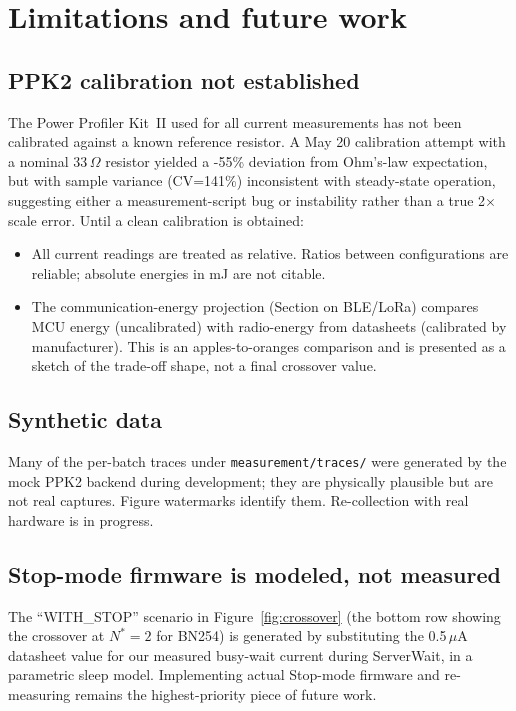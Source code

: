 \documentclass[11pt,a4paper]{article}
\begin{document}
\section{Limitations and future work}
\label{sec:limitations}

\subsection{PPK2 calibration not established}

The Power Profiler Kit~II used for all current measurements has
not been calibrated against a known reference resistor. A May 20
calibration attempt with a nominal 33\,$\Omega$ resistor yielded
a -55\% deviation from Ohm's-law expectation, but with sample
variance (CV=141\%) inconsistent with steady-state operation,
suggesting either a measurement-script bug or instability rather
than a true 2$\times$ scale error. Until a clean calibration is
obtained:

\begin{itemize}
  \item All current readings are treated as relative. Ratios
        between configurations are reliable; absolute energies
        in mJ are not citable.
  \item The communication-energy projection (Section on BLE/LoRa)
        compares MCU energy (uncalibrated) with radio-energy
        from datasheets (calibrated by manufacturer). This is
        an apples-to-oranges comparison and is presented as
        a sketch of the trade-off shape, not a final crossover
        value.
\end{itemize}

\subsection{Synthetic data}

Many of the per-batch traces under \texttt{measurement/traces/}
were generated by the mock PPK2 backend during development; they
are physically plausible but are not real captures. Figure
watermarks identify them. Re-collection with real hardware is
in progress.

\subsection{Stop-mode firmware is modeled, not measured}

The ``WITH\_STOP'' scenario in Figure~\ref{fig:crossover} (the
bottom row showing the crossover at $N^*\!=\!2$ for BN254) is
generated by substituting the 0.5\,$\mu$A datasheet value for our
measured busy-wait current during ServerWait, in a parametric
sleep model. Implementing actual Stop-mode firmware and re-measuring
remains the highest-priority piece of future work.
\end{document}
